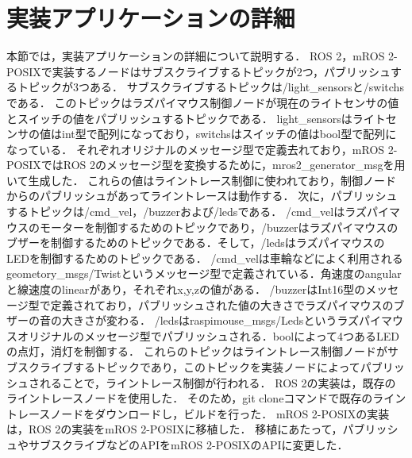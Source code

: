 \section{実装アプリケーションの詳細}
本節では，実装アプリケーションの詳細について説明する．
ROS 2，mROS 2-POSIXで実装するノードはサブスクライブするトピックが2つ，パブリッシュするトピックが3つある．
サブスクライブするトピックは/light\_sensorsと/switchsである．
このトピックはラズパイマウス制御ノードが現在のライトセンサの値とスイッチの値をパブリッシュするトピックである．
light\_sensorsはライトセンサの値はint型で配列になっており，switchsはスイッチの値はbool型で配列になっている．
それぞれオリジナルのメッセージ型で定義去れており，mROS 2-POSIXではROS 2のメッセージ型を変換するために，mros2\_generator\_msgを用いて生成した．
これらの値はライントレース制御に使われており，制御ノードからのパブリッシュがあってライントレースは動作する．
次に，パブリッシュするトピックは/cmd\_vel，/buzzerおよび/ledsである．
/cmd\_velはラズパイマウスのモーターを制御するためのトピックであり，/buzzerはラズパイマウスのブザーを制御するためのトピックである．そして，/ledsはラズパイマウスのLEDを制御するためのトピックである．
/cmd\_velは車輪などによく利用されるgeometory\_msgs/Twistというメッセージ型で定義されている．角速度のangularと線速度のlinearがあり，それぞれx,y,zの値がある．
/buzzerはInt16型のメッセージ型で定義されており，パブリッシュされた値の大きさでラズパイマウスのブザーの音の大きさが変わる．
/ledsはraspimouse\_msgs/Ledsというラズパイマウスオリジナルのメッセージ型でパブリッシュされる．boolによって4つあるLEDの点灯，消灯を制御する．
これらのトピックはライントレース制御ノードがサブスクライブするトピックであり，このトピックを実装ノードによってパブリッシュされることで，ライントレース制御が行われる．
ROS 2の実装は，既存のライントレースノードを使用した．
そのため，git cloneコマンドで既存のライントレースノードをダウンロードし，ビルドを行った．
mROS 2-POSIXの実装は，ROS 2の実装をmROS 2-POSIXに移植した．
移植にあたって，パブリッシュやサブスクライブなどのAPIをmROS 2-POSIXのAPIに変更した．

